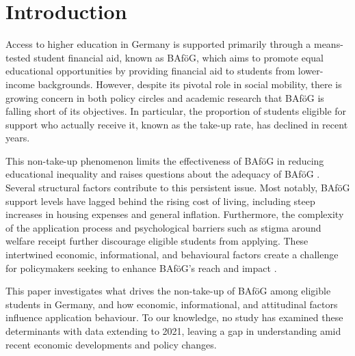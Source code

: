 \section{Introduction} \label{sec:intro}



Access to higher education in Germany is supported primarily through a means-tested student financial aid, known as BAföG, which aims to promote equal educational opportunities by providing financial aid to students from lower-income backgrounds. 
However, despite its pivotal role in social mobility, there is growing concern in both policy circles and academic research that BAföG is falling short of its objectives. 
In particular, the proportion of students eligible for support who actually receive it, known as the take-up rate, has declined in recent years. 

This non-take-up phenomenon limits the effectiveness of BAföG in reducing educational inequality and raises questions about the adequacy of BAföG \citep{gwosc_krisenbewaltigung_2022, meier_bafog_2024}. 
Several structural factors contribute to this persistent issue. 
Most notably, BAföG support levels have lagged behind the rising cost of living, including steep increases in housing expenses and general inflation.
Furthermore, the complexity of the application process and psychological barriers such as stigma around welfare receipt further discourage eligible students from applying. 
These intertwined economic, informational, and behavioural factors create a challenge for policymakers seeking to enhance BAföG’s reach and impact \citep{meier_bafog_2024, staack_von_2017}.



This paper investigates what drives the non-take-up of BAföG among eligible students in Germany, and how economic, informational, and attitudinal factors influence application behaviour. 
To our knowledge, no study has examined these determinants with data extending to 2021, leaving a gap in understanding amid recent economic developments and policy changes.

